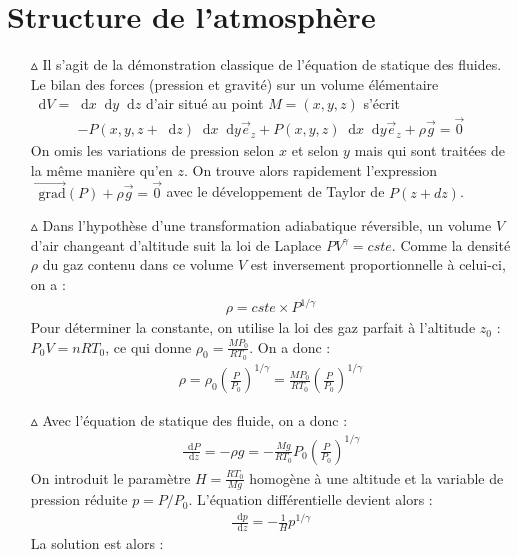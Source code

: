 \documentclass{report}
\newcommand*\dif{\mathop{}\!\mathrm{d}}
\newcommand*\grad{\mathop{}\!\mathrm{grad}}
\begin{document}
\section*{Structure de l'atmosphère}

\begin{itemize}

	\item[$\vartriangle$] Il s'agit de la démonstration classique de l'équation de statique des fluides. Le bilan des forces (pression et gravité) sur un volume élémentaire $\dif V=\dif x \dif y \dif z$ d'air situé au point $M=(x,y,z)$ s'écrit
	\begin{align*}
		-P(x,y,z+ \dif z)\dif x\dif y\vec{e}_z+P(x,y,z)\dif x\dif y\vec{e}_z+\rho\vec{g}=\vec{0}
	\end{align*}
	On omis les variations de pression selon $x$ et selon $y$ mais qui sont traitées de la même manière qu'en $z$. On trouve alors rapidement l'expression $\vec{\grad}(P) + \rho\vec{g}=\vec{0}$ avec le développement de Taylor de $P(z+dz)$.
	
	\item[$\vartriangle$] Dans l'hypothèse d'une transformation adiabatique réversible, un volume $V$ d'air changeant d'altitude suit la loi de Laplace $PV^\gamma=cste$. Comme la densité $\rho$ du gaz contenu dans ce volume $V$ est inversement proportionnelle à celui-ci, on a :
	\begin{align*}
		\rho = cste\times P^{1/\gamma}
	\end{align*}
	Pour déterminer la constante, on utilise la loi des gaz parfait à l'altitude $z_0$ : $P_0V=nRT_0$, ce qui donne $\rho_0=\frac{MP_0}{RT_0}$. On a donc :
	\begin{align*}
		\rho = \rho_0\left(\frac{P}{P_0} \right) ^{1/\gamma}=\frac{MP_0}{RT_0}\left(\frac{P}{P_0} \right) ^{1/\gamma}
	\end{align*}
	
	\item[$\vartriangle$] Avec l'équation de statique des fluide, on a donc :
	\begin{align*}
		\frac{\dif P}{\dif z}=-\rho g = -\frac{Mg}{RT_0}P_0\left(\frac{P}{P_0} \right) ^{1/\gamma}
	\end{align*}
	On introduit le paramètre $H=\frac{RT_0}{Mg}$ homogène à une altitude et la variable de pression réduite $p=P/P_0$. L'équation différentielle devient alors :
	\begin{align*}
		\frac{\dif p}{\dif z}=-\frac{1}{H}p^{1/\gamma}
	\end{align*}	
	La solution est alors :
	

\end{itemize}
\end{document}
